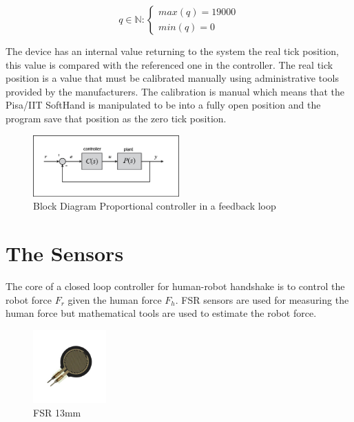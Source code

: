 \begin{equation}
q \in \mathbb{N} : \left\{\begin{matrix}
max(q) = 19000 \\ 
min(q) = 0
\end{matrix}\right.
\label{EQ:qlimits}
\end{equation}

The device has an internal value returning to the system the real tick position, this value is compared with the referenced one in the controller. The real tick position is a value that must be calibrated manually using administrative tools provided by the manufacturers. 
The calibration is manual which means that the Pisa/IIT SoftHand is manipulated to be into a fully open position and the program save that position as the zero tick position.

\begin{figure}[h]
\centering
\includegraphics[width=0.5\textwidth]{Figure/feedbackP.png}
\caption{Block Diagram Proportional controller in a feedback loop}
\label{Fig:Pr}
\end{figure}


\section{The Sensors}
The core of a closed loop controller for human-robot handshake is to control the robot force $F_{r}$ given the human force $F_{h}$. FSR sensors are used for measuring the human force but mathematical tools are used to estimate the robot force. 

\begin{figure}
\centering
\includegraphics[width=0.25\textwidth]{Figure/fsrsingle1.png}
\caption{FSR 13mm}
\label{Fig:FSRsingle}
\end{figure}

